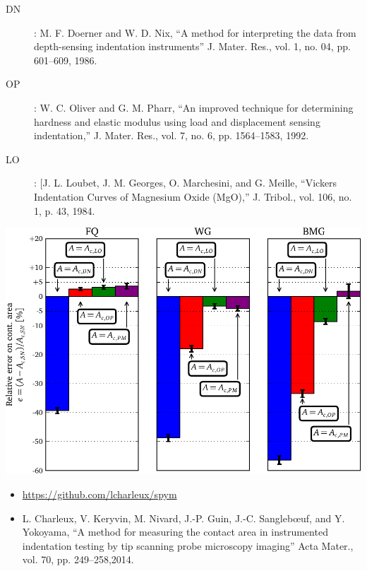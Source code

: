 \documentclass[a0paper,portrait]{baposter}
\begin{document}
\begin{poster}
{{\footnotesize
\begin{description}
\item[DN]:  M. F. Doerner and W. D. Nix, “A method for interpreting the data from depth-sensing indentation instruments” J. Mater. Res., vol. 1, no. 04, pp. 601–609, 1986.
\item[OP]: W. C. Oliver and G. M. Pharr, “An improved technique for determining hardness and elastic modulus using load and displacement sensing indentation,” J. Mater. Res., vol. 7, no. 6, pp. 1564–1583, 1992.
\item[LO]: [J. L. Loubet, J. M. Georges, O. Marchesini, and G. Meille, “Vickers Indentation Curves of Magnesium Oxide (MgO),” J. Tribol., vol. 106, no. 1, p. 43, 1984.
\end{description}}
}
%
{

\includegraphics[width=\linewidth]{figure_7}


}
{
\begin{itemize}
\item \url{https://github.com/lcharleux/spym}
\item L. Charleux, V. Keryvin, M. Nivard, J.-P. Guin, J.-C. Sanglebœuf, and Y. Yokoyama, “A method for measuring the contact area in instrumented indentation testing by tip scanning probe microscopy imaging” Acta Mater., vol. 70, pp. 249–258,2014.
\end{itemize}



}

\end{poster}
\end{document}
